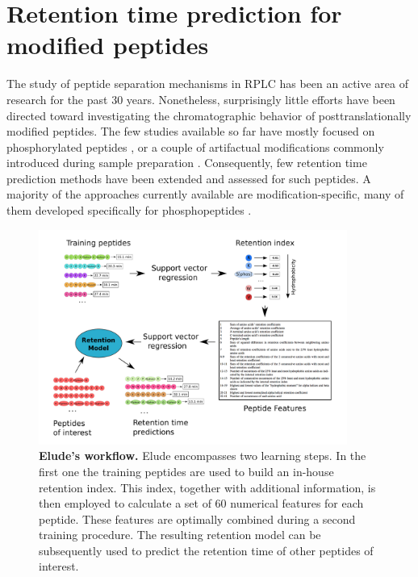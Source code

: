 \documentclass[a4paper]{article}
\begin{document}
\section{\label{sec:rtpredm}Retention time prediction for modified peptides}

The study of peptide separation mechanisms in RPLC has been an active
area of research for the past 30 years. Nonetheless, surprisingly
little efforts have been directed toward investigating the
chromatographic behavior of posttranslationally modified peptides. The
few studies available so far have mostly focused on phosphorylated
peptides \cite{Kim2007}, or a couple of artifactual modifications
commonly introduced during sample
preparation \cite{Reimer2011}. Consequently, few retention time
prediction methods have been extended and assessed for such
peptides. A majority of the approaches currently available are
modification-specific, many of them developed specifically for
phosphopeptides \cite{Kawakami2005, perlova2010}.

\begin{figure}[!h]
\centering 
\includegraphics[width=0.9\textwidth]{img/elude-ptm.pdf}
\caption{\label{fig:elude} {\bf {\sc Elude}'s workflow.}  {\sc Elude} encompasses two learning steps. In the first one the training peptides are used to build an in-house retention index. This index, together with additional information, is then employed to calculate a set of 60 numerical features for each peptide. These features are optimally combined during a second training procedure. The resulting retention model can be subsequently used to predict the retention time of other peptides of interest.}
\end{figure}
\end{document}
